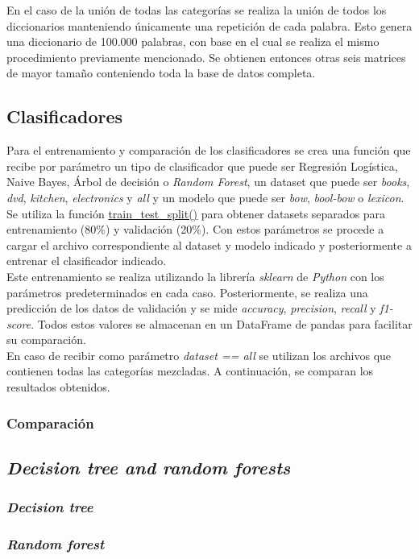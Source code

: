 En el caso de la unión de todas las categorías se realiza la unión de todos los diccionarios manteniendo únicamente una repetición de cada palabra. Esto genera una diccionario de 100.000 palabras, con base en el cual se realiza el mismo procedimiento previamente mencionado. Se obtienen entonces otras seis matrices de mayor tamaño conteniendo toda la base de datos completa.

\subsection{Clasificadores}
Para el entrenamiento y comparación de los clasificadores se crea una función que recibe por parámetro un tipo de clasificador que puede ser Regresión Logística, Naive Bayes, Árbol de decisión o \textit{Random Forest}, un dataset que puede ser \textit{books}, \textit{dvd}, \textit{kitchen}, \textit{electronics} y \textit{all} y un modelo que puede ser \textit{bow}, \textit{bool-bow} o \textit{lexicon}. Se utiliza la función \url{train\_test\_split()} para obtener datasets separados para entrenamiento (80\%) y validación (20\%). Con estos parámetros se procede a cargar el archivo correspondiente al dataset y modelo indicado y posteriormente a entrenar el clasificador indicado.\\

Este entrenamiento se realiza utilizando la librería \textit{sklearn} de \textit{Python} con los parámetros predeterminados en cada caso. Posteriormente, se realiza una predicción de los datos de validación y se mide \textit{accuracy}, \textit{precision}, \textit{recall} y \textit{f1-score}. Todos estos valores se almacenan en un DataFrame de pandas para facilitar su comparación.\\

En caso de recibir como parámetro \textit{dataset == all} se utilizan los archivos que contienen todas las categorías mezcladas. A continuación, se comparan los resultados obtenidos.

\subsubsection{Comparación}

\subsection{\textit{Decision tree and random forests}}
\subsubsection{\textit{Decision tree}}
\subsubsection{\textit{Random forest}}